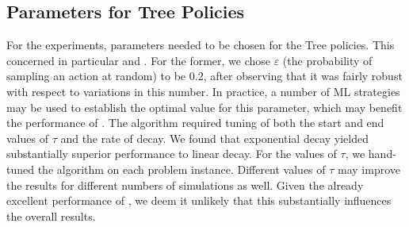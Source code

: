 \subsection{Parameters for Tree Policies}
\label{subsec:params}
For the experiments, parameters needed to be chosen for the Tree policies. This concerned in particular \egreedy and \soft. For the former, we chose $\varepsilon$ (the probability of sampling an action at random) to be 0.2, after observing that it was fairly robust with respect to variations in this number. In practice, a number of ML strategies may be used to establish the optimal value for this parameter, which may benefit the performance of \egreedy. The \soft algorithm required tuning of both the start and end values of $\tau$ and the rate of decay. We found that exponential decay yielded substantially superior performance to linear decay. For the values of $\tau$, we hand-tuned the algorithm on each problem instance. Different values of $\tau$ may improve the results for different numbers of simulations as well. Given the already excellent performance of \soft, we deem it unlikely that this substantially influences the overall results.